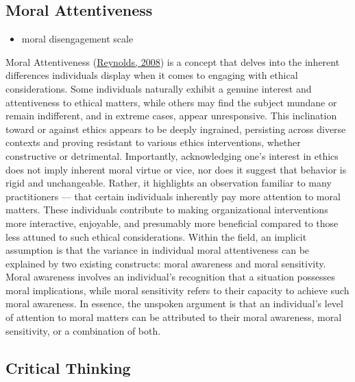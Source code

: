 \documentclass[
  12pt,
  a4paper,
  twoside]{article}
\providecommand{\tightlist}{%
  \setlength{\itemsep}{0pt}\setlength{\parskip}{0pt}}
\begin{document}
\hypertarget{moral-attentiveness}{%
\subsection{Moral Attentiveness}\label{moral-attentiveness}}

\begin{itemize}
\tightlist
\item
  moral disengagement scale
\end{itemize}

Moral Attentiveness (\protect\hyperlink{ref-reynolds2008}{Reynolds, 2008}) is a concept that delves into the inherent differences individuals display when it comes to engaging with ethical considerations. Some individuals naturally exhibit a genuine interest and attentiveness to ethical matters, while others may find the subject mundane or remain indifferent, and in extreme cases, appear unresponsive. This inclination toward or against ethics appears to be deeply ingrained, persisting across diverse contexts and proving resistant to various ethics interventions, whether constructive or detrimental.
Importantly, acknowledging one's interest in ethics does not imply inherent moral virtue or vice, nor does it suggest that behavior is rigid and unchangeable. Rather, it highlights an observation familiar to many practitioners --- that certain individuals inherently pay more attention to moral matters. These individuals contribute to making organizational interventions more interactive, enjoyable, and presumably more beneficial compared to those less attuned to such ethical considerations.
Within the field, an implicit assumption is that the variance in individual moral attentiveness can be explained by two existing constructs: moral awareness and moral sensitivity. Moral awareness involves an individual's recognition that a situation possesses moral implications, while moral sensitivity refers to their capacity to achieve such moral awareness. In essence, the unspoken argument is that an individual's level of attention to moral matters can be attributed to their moral awareness, moral sensitivity, or a combination of both.

\hypertarget{critical-thinking}{%
\subsection{Critical Thinking}\label{critical-thinking}}
\end{document}
